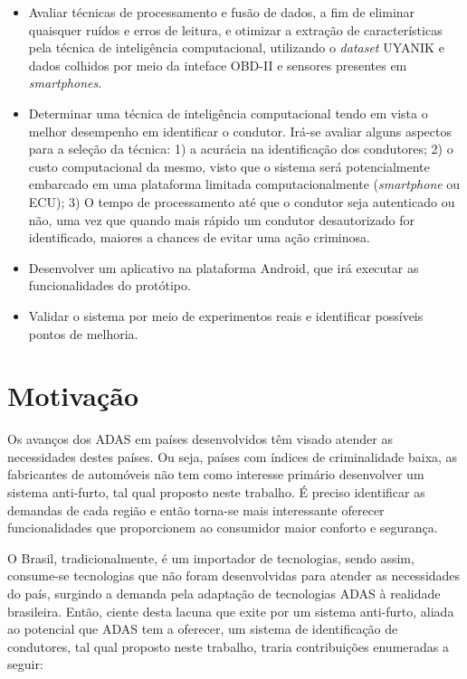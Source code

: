 \begin{itemize}
	
	\item Avaliar técnicas de processamento e fusão de dados, a fim de eliminar quaisquer ruídos e erros de leitura, e otimizar a extração de características pela técnica de inteligência computacional, utilizando o \textit{dataset} UYANIK \cite{Abut2007} e dados colhidos por meio da inteface OBD-II e sensores presentes em \textit{smartphones}.
	
	\item Determinar uma técnica de inteligência computacional tendo em vista o melhor desempenho em identificar o condutor. Irá-se avaliar alguns aspectos para a seleção da técnica: 1) a acurácia na identificação dos condutores; 2) o custo computacional da mesmo, visto que o sistema será potencialmente embarcado em uma plataforma limitada computacionalmente (\textit{smartphone} ou ECU); 3) O tempo de processamento até que o condutor seja autenticado ou não, uma vez que quando mais rápido um condutor desautorizado for identificado, maiores a chances de evitar uma ação criminosa.
	
	\item Desenvolver um aplicativo na plataforma Android, que irá executar as funcionalidades do protótipo.
	
	\item Validar o sistema por meio de experimentos reais e identificar possíveis pontos de melhoria.
	
\end{itemize} 

\section{Motivação}

Os avanços dos ADAS em países desenvolvidos têm visado atender as necessidades destes países. Ou seja, países com índices de criminalidade baixa, as fabricantes de automóveis não tem como interesse primário desenvolver um sistema anti-furto, tal qual proposto neste trabalho. É preciso identificar as demandas de cada região e então torna-se mais interessante oferecer funcionalidades que proporcionem ao consumidor maior conforto e segurança.

O Brasil, tradicionalmente, é um importador de tecnologias, sendo assim, consume-se tecnologias que não foram desenvolvidas para atender as necessidades do país, surgindo a demanda pela adaptação de tecnologias ADAS à realidade brasileira. Então, ciente desta lacuna que exite por um sistema anti-furto, aliada ao potencial que ADAS tem a oferecer, um sistema de identificação de condutores, tal qual proposto neste trabalho, traria contribuições enumeradas a seguir:

